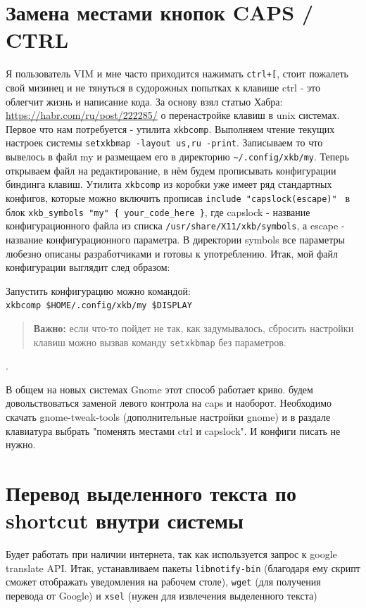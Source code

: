 \documentclass[a4paper, 12pt]{report}
\begin{document}
\section{Замена местами кнопок CAPS / CTRL} Я пользователь VIM и мне часто приходится нажимать \lstinline|ctrl+[|, стоит пожалеть свой мизинец и не тянуться в судорожных попытках к клавише ctrl - это облегчит жизнь и написание кода. За основу взял статью Хабра: \href{https://habr.com/ru/post/222285/}{https://habr.com/ru/post/222285/} о перенастройке клавиш в unix системах. Первое что нам потребуется - утилита \lstinline|xkbcomp|.
Выполняем чтение текущих настроек системы \lstinline|setxkbmap -layout us,ru -print|. Записываем то что вывелось в файл my и размещаем его в директорию \lstinline|~/.config/xkb/my|. Теперь открываем файл на редактирование, в нём будем прописывать конфигурации биндинга клавиш.
Утилита \lstinline|xkbcomp| из коробки уже имеет ряд стандартных конфигов, которые можно включить прописав \lstinline|include "capslock(escape)" | в блок \lstinline|xkb_symbols "my" { your_code_here }|, где capslock - название конфигурационного файла из списка \lstinline|/usr/share/X11/xkb/symbols|, а escape - название конфигурационного параметра. В директории symbols все параметры любезно описаны разработчиками и готовы к употреблению. 
Итак, мой файл конфигурации выглядит след образом: 

Запустить конфигурацию можно командой:\\ \lstinline|xkbcomp $HOME/.config/xkb/my $DISPLAY|\\

\begin{quote}
\textbf{Важно:} если что-то пойдет не так, как задумывалось, сбросить настройки клавиш можно вызвав команду \lstinline|setxkbmap| без параметров.
\end{quote}.

В общем на новых системах Gnome этот способ работает криво. будем довольствоваться заменой левого контрола на caps и наоборот. Необходимо скачать gnome-tweak-tools (дополнительные настройки gnome) и в раздале клавиатура выбрать "поменять местами ctrl и capslock". И конфиги писать не нужно.

\section{Перевод выделенного текста по shortcut внутри системы} Будет работать при наличии интернета, так как используется запрос к google translate API. Итак, устанавливаем пакеты \lstinline|libnotify-bin| (благодаря ему скрипт сможет отображать уведомления на рабочем столе), \lstinline|wget| (для получения перевода от Google) и \lstinline|xsel| (нужен для извлечения выделенного текста)\\
\end{document}
